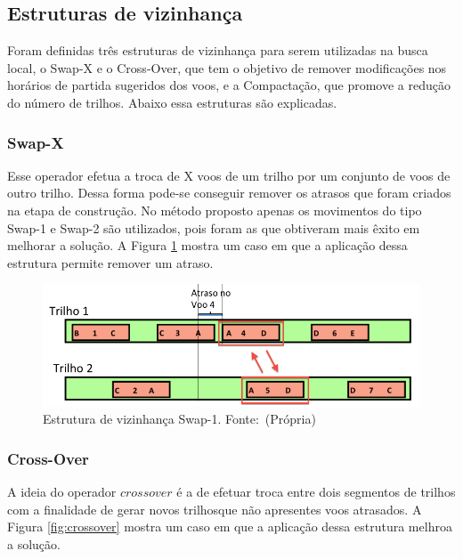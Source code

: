 \subsection{Estruturas de vizinhança}
 
Foram definidas três estruturas de vizinhança para serem utilizadas na busca
local, o Swap-X e o Cross-Over, que tem o objetivo de remover modificações nos
horários de partida sugeridos dos voos, e a Compactação, que promove a redução
do número de trilhos. Abaixo essa estruturas são explicadas.
 
\subsubsection{Swap-X}

Esse operador efetua a troca de X voos de um trilho por um conjunto de voos de
outro trilho. Dessa forma pode-se conseguir remover os atrasos que foram criados
na etapa de construção. No método proposto apenas os movimentos do tipo Swap-1
e Swap-2 são utilizados, pois foram as que obtiveram mais êxito em melhorar a
solução. A Figura \ref{fig:swap1} mostra um caso em que a aplicação dessa
estrutura permite remover um atraso.

\begin{figure}[ht]
	\caption{Estrutura de vizinhança Swap-1. \newline \mbox{Fonte:
	(Própria)}}\label{fig:swap1}
	\includegraphics[scale=0.4]{./img/swap-1}
	
\end{figure}
 
 \subsubsection{Cross-Over}
 
A ideia do operador $crossover$ é a de efetuar troca entre dois segmentos de
trilhos com a finalidade de gerar novos trilhosque não apresentes voos
atrasados. A Figura \ref{fig:crossover} mostra um caso em que a aplicação dessa
estrutura melhroa a solução.


